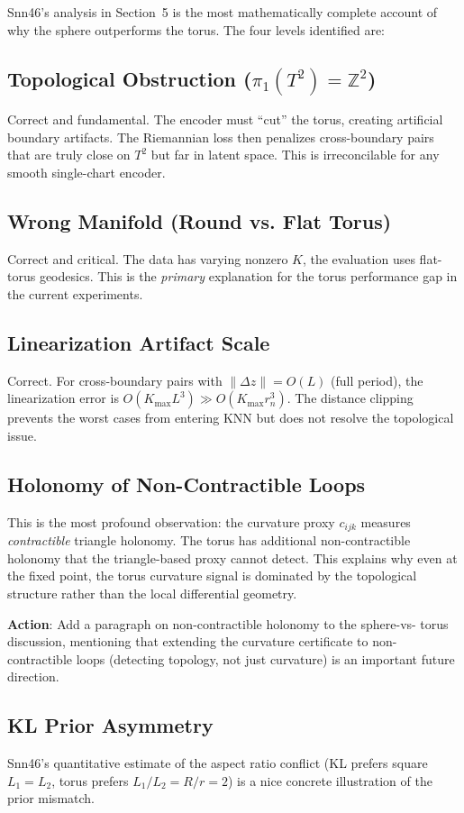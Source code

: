 \documentclass{article}
\begin{document}
Snn46's analysis in Section~5 is the most mathematically complete account of
why the sphere outperforms the torus. The four levels identified are:

\subsection{Topological Obstruction ($\pi_1(T^2) = \mathbb{Z}^2$)}
Correct and fundamental. The encoder must ``cut'' the torus, creating artificial
boundary artifacts. The Riemannian loss then penalizes cross-boundary pairs that
are truly close on $T^2$ but far in latent space. This is irreconcilable for
any smooth single-chart encoder.

\subsection{Wrong Manifold (Round vs. Flat Torus)}
Correct and critical. The data has varying nonzero $K$, the evaluation uses
flat-torus geodesics. This is the \emph{primary} explanation for the torus
performance gap in the current experiments.

\subsection{Linearization Artifact Scale}
Correct. For cross-boundary pairs with $\|\Delta z\| = O(L)$ (full period),
the linearization error is $O(K_{\max} L^3) \gg O(K_{\max} r_n^3)$. The
distance clipping prevents the worst cases from entering KNN but does not
resolve the topological issue.

\subsection{Holonomy of Non-Contractible Loops}
This is the most profound observation: the curvature proxy $c_{ijk}$ measures
\emph{contractible} triangle holonomy. The torus has additional non-contractible
holonomy that the triangle-based proxy cannot detect. This explains why even
at the fixed point, the torus curvature signal is dominated by the topological
structure rather than the local differential geometry.

\textbf{Action}: Add a paragraph on non-contractible holonomy to the sphere-vs-
torus discussion, mentioning that extending the curvature certificate to
non-contractible loops (detecting topology, not just curvature) is an
important future direction.

\subsection{KL Prior Asymmetry}
Snn46's quantitative estimate of the aspect ratio conflict (KL prefers square
$L_1 = L_2$, torus prefers $L_1/L_2 = R/r = 2$) is a nice concrete illustration
of the prior mismatch.
\end{document}
